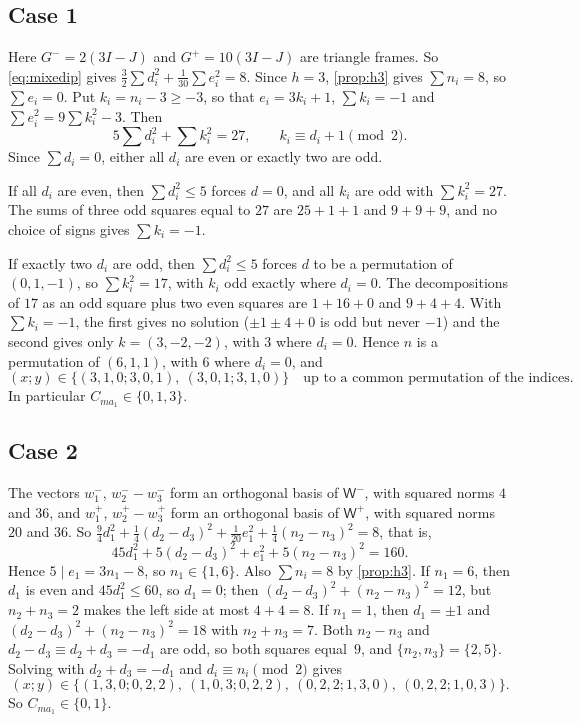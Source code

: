 \documentclass[11pt,a4paper]{amsart}
\theoremstyle{definition}
\theoremstyle{remark}
\newcommand{\Wm}{\mathsf{W}^{-}}
\newcommand{\Wp}{\mathsf{W}^{+}}
\begin{document}
\subsection*{Case 1}
Here $G^-=2(3I-J)$ and $G^+=10(3I-J)$ are triangle frames. So \eqref{eq:mixedip} gives
$\frac32\sum d_i^2+\frac1{30}\sum e_i^2=8$. Since $h=3$, \cref{prop:h3} gives $\sum n_i=8$, so $\sum e_i=0$.
Put $k_i=n_i-3\ge-3$, so that $e_i=3k_i+1$, $\sum k_i=-1$ and $\sum e_i^2=9\sum k_i^2-3$. Then
\[
5\textstyle\sum d_i^2+\sum k_i^2=27,\qquad k_i\equiv d_i+1\pmod2 .
\]
Since $\sum d_i=0$, either all $d_i$ are even or exactly two are odd.

If all $d_i$ are even, then $\sum d_i^2\le5$ forces $d=0$, and all $k_i$ are odd with $\sum k_i^2=27$. The
sums of three odd squares equal to $27$ are $25+1+1$ and $9+9+9$, and no choice of signs gives $\sum k_i=-1$.

If exactly two $d_i$ are odd, then $\sum d_i^2\le5$ forces $d$ to be a permutation of $(0,1,-1)$, so
$\sum k_i^2=17$, with $k_i$ odd exactly where $d_i=0$. The decompositions of $17$ as an odd square plus two
even squares are $1+16+0$ and $9+4+4$. With $\sum k_i=-1$, the first gives no solution ($\pm1\pm4+0$ is odd
but never $-1$) and the second gives only $k=(3,-2,-2)$, with $3$ where $d_i=0$. Hence $n$ is a permutation
of $(6,1,1)$, with $6$ where $d_i=0$, and
\[
(x;y)\in\{(3,1,0;3,0,1),\ (3,0,1;3,1,0)\}\quad\text{up to a common permutation of the indices.}
\]
In particular $C_{ma_1}\in\{0,1,3\}$.

\subsection*{Case 2}
The vectors $w_1^-$, $w_2^--w_3^-$ form an orthogonal basis of $\Wm$, with squared norms $4$ and $36$, and
$w_1^+$, $w_2^+-w_3^+$ form an orthogonal basis of $\Wp$, with squared norms $20$ and $36$. So
$\frac94d_1^2+\frac14(d_2-d_3)^2+\frac1{20}e_1^2+\frac14(n_2-n_3)^2=8$, that is,
\[
45d_1^2+5(d_2-d_3)^2+e_1^2+5(n_2-n_3)^2=160 .
\]
Hence $5\mid e_1=3n_1-8$, so $n_1\in\{1,6\}$. Also $\sum n_i=8$ by \cref{prop:h3}. If $n_1=6$, then $d_1$ is even
and $45d_1^2\le60$, so $d_1=0$; then $(d_2-d_3)^2+(n_2-n_3)^2=12$, but $n_2+n_3=2$ makes the left side at most
$4+4=8$. If $n_1=1$, then $d_1=\pm1$ and $(d_2-d_3)^2+(n_2-n_3)^2=18$ with $n_2+n_3=7$. Both $n_2-n_3$ and
$d_2-d_3\equiv d_2+d_3=-d_1$ are odd, so both squares equal~$9$, and $\{n_2,n_3\}=\{2,5\}$. Solving with
$d_2+d_3=-d_1$ and $d_i\equiv n_i\pmod 2$ gives
\[
(x;y)\in\{(1,3,0;0,2,2),\ (1,0,3;0,2,2),\ (0,2,2;1,3,0),\ (0,2,2;1,0,3)\}.
\]
So $C_{ma_1}\in\{0,1\}$.
\end{document}
